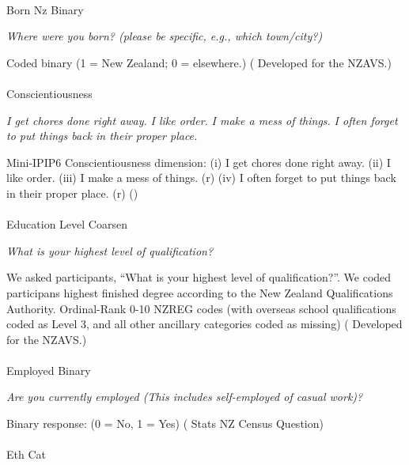 \documentclass[
  single column]{article}
\makeatletter
\let\oldparagraph\paragraph
\renewcommand{\paragraph}{
    \@ifstar
      \xxxParagraphStar
      \xxxParagraphNoStar
  }
\newcommand{\xxxParagraphStar}[1]{\oldparagraph*{#1}\mbox{}}
\newcommand{\xxxParagraphNoStar}[1]{\oldparagraph{#1}\mbox{}}
\makeatother
\begin{document}
\paragraph{Born Nz Binary}\label{born-nz-binary}

\emph{Where were you born? (please be specific, e.g., which town/city?)}

Coded binary (1 = New Zealand; 0 = elsewhere.)
( Developed for the
NZAVS.)

\paragraph{Conscientiousness}\label{conscientiousness}

\emph{I get chores done right away.} \emph{I like order.} \emph{I make a
mess of things.} \emph{I often forget to put things back in their proper
place.}

Mini-IPIP6 Conscientiousness dimension: (i) I get chores done right
away. (ii) I like order. (iii) I make a mess of things. (r) (iv) I often
forget to put things back in their proper place. (r)
()

\paragraph{Education Level Coarsen}\label{education-level-coarsen}

\emph{What is your highest level of qualification?}

We asked participants, ``What is your highest level of qualification?''.
We coded participans highest finished degree according to the New
Zealand Qualifications Authority. Ordinal-Rank 0-10 NZREG codes (with
overseas school qualifications coded as Level 3, and all other ancillary
categories coded as missing)
( Developed for the
NZAVS.)

\paragraph{Employed Binary}\label{employed-binary}

\emph{Are you currently employed (This includes self-employed of casual
work)?}

Binary response: (0 = No, 1 = Yes)
( Stats NZ Census
Question)

\paragraph{Eth Cat}\label{eth-cat}
\end{document}
